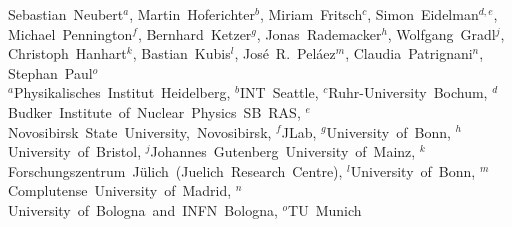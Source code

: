 \mbox{Sebastian Neubert$^a$}, \mbox{Martin Hoferichter$^b$}, \mbox{Miriam Fritsch$^c$}, \mbox{Simon Eidelman$^{d,e}$}, \mbox{Michael Pennington$^f$}, \mbox{Bernhard Ketzer$^g$}, \mbox{Jonas Rademacker$^h$}, \mbox{Wolfgang Gradl$^j$}, \mbox{Christoph Hanhart$^k$}, \mbox{Bastian Kubis$^l$}, \mbox{José R. Peláez$^m$}, \mbox{Claudia Patrignani$^n$}, \mbox{Stephan Paul$^o$} \\ \vspace{3mm}
\mbox{$^a$Physikalisches Institut Heidelberg}, \mbox{$^b$INT Seattle}, \mbox{$^c$Ruhr-University Bochum}, \mbox{$^d$Budker Institute of Nuclear Physics SB RAS}, \mbox{$^e$Novosibirsk State University, Novosibirsk}, \mbox{$^f$JLab}, \mbox{$^g$University of Bonn}, \mbox{$^h$University of Bristol}, \mbox{$^j$Johannes Gutenberg University of Mainz}, \mbox{$^k$Forschungszentrum Jülich (Juelich Research Centre)}, \mbox{$^l$University of Bonn}, \mbox{$^m$Complutense University of Madrid}, \mbox{$^n$University of Bologna and INFN Bologna}, \mbox{$^o$TU Munich}

